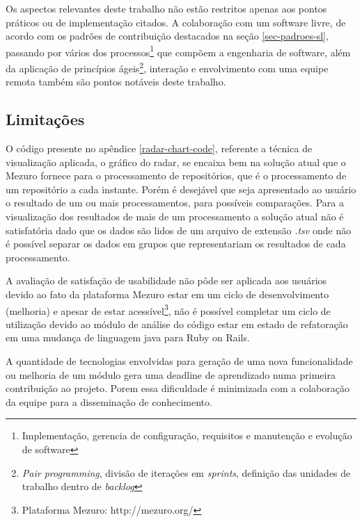 Os aspectos relevantes deste trabalho não estão restritos apenas aos  pontos práticos ou de implementação citados. A colaboração com um software livre, de acordo com os padrões de contribuição destacados na seção \ref{sec-padroes-sl}, passando por vários dos processos\footnote{Implementação, gerencia de configuração, requisitos e manutenção e evolução de software} que compõem a engenharia de software, além da aplicação de princípios ágeis\footnote{\textit{Pair programming}, divisão de iterações em \textit{sprints}, definição das unidades de trabalho dentro de \textit{backlog}}, interação e envolvimento com uma equipe remota também são pontos notáveis deste trabalho.

\subsection{Limitações}
O código presente no apêndice \ref{radar-chart-code}, referente a técnica de visualização aplicada, o gráfico do radar, se encaixa bem na solução atual que o Mezuro fornece para o processamento de repositórios, que é o processamento de um repositório a cada instante. Porém é desejável que seja apresentado ao usuário o resultado de um ou mais processamentos, para possíveis comparações. Para a visualização dos resultados de mais de um processamento a solução atual não é satisfatória dado que os dados são lidos de um arquivo de extensão \textit{.tsv} onde não é possível separar os dados em grupos que representariam os resultados de cada processamento.

A avaliação de satisfação de usabilidade não pôde ser aplicada aos usuários devido ao fato da plataforma Mezuro estar em um ciclo de desenvolvimento (melhoria) e apesar de estar acessível\footnote{Plataforma Mezuro: http://mezuro.org/}, não é possível completar um ciclo de utilização devido ao módulo de análise do código estar em estado de refatoração em uma mudança de linguagem java para Ruby on Rails.

A quantidade de tecnologias envolvidas para geração de uma nova funcionalidade ou melhoria de um módulo gera uma deadline de aprendizado numa primeira contribuição ao projeto. Porem essa dificuldade é minimizada com a colaboração da equipe para a disseminação de conhecimento.

